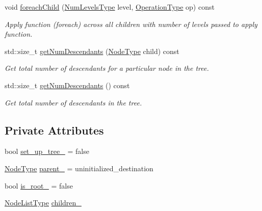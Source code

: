 \begin{DoxyCompactItemize}
void \hyperlink{structvt_1_1collective_1_1tree_1_1_tree_a8200f03bf19b18b2323d1fcb99d5335f}{foreach\+Child} (\hyperlink{structvt_1_1collective_1_1tree_1_1_tree_af64acc9543dc1bd1b56d6ed17b003425}{Num\+Levels\+Type} level, \hyperlink{structvt_1_1collective_1_1tree_1_1_tree_a5ce4242e9580c807baa74168401f381a}{Operation\+Type} op) const
\begin{DoxyCompactList}\small\item\em Apply function (foreach) across all children with number of levels passed to apply function. \end{DoxyCompactList}\item 
std\+::size\+\_\+t \hyperlink{structvt_1_1collective_1_1tree_1_1_tree_a5375e6fbda5c36891b21cc17acc204dd}{get\+Num\+Descendants} (\hyperlink{namespacevt_a866da9d0efc19c0a1ce79e9e492f47e2}{Node\+Type} child) const
\begin{DoxyCompactList}\small\item\em Get total number of descendants for a particular node in the tree. \end{DoxyCompactList}\item 
std\+::size\+\_\+t \hyperlink{structvt_1_1collective_1_1tree_1_1_tree_a26e27c8c2da5db17c5cc26f15c2ebfb8}{get\+Num\+Descendants} () const
\begin{DoxyCompactList}\small\item\em Get total number of descendants in the tree. \end{DoxyCompactList}\end{DoxyCompactItemize}
\subsection*{Private Attributes}
\begin{DoxyCompactItemize}
\item 
bool \hyperlink{structvt_1_1collective_1_1tree_1_1_tree_af240b20228198eae21c33e1b6a042fe2}{set\+\_\+up\+\_\+tree\+\_\+} = false
\item 
\hyperlink{namespacevt_a866da9d0efc19c0a1ce79e9e492f47e2}{Node\+Type} \hyperlink{structvt_1_1collective_1_1tree_1_1_tree_a9984c66b641a7a3ea9db6afc686739b0}{parent\+\_\+} = uninitialized\+\_\+destination
\item 
bool \hyperlink{structvt_1_1collective_1_1tree_1_1_tree_abe6e5a200fc08f3dc040bd134e97d8f2}{is\+\_\+root\+\_\+} = false
\item 
\hyperlink{structvt_1_1collective_1_1tree_1_1_tree_a834e7b54ea2dceae42db7c5ea859753f}{Node\+List\+Type} \hyperlink{structvt_1_1collective_1_1tree_1_1_tree_ad4485d4ba90addf6bd7e25425d4cf6dd}{children\+\_\+}
\end{DoxyCompactItemize}


